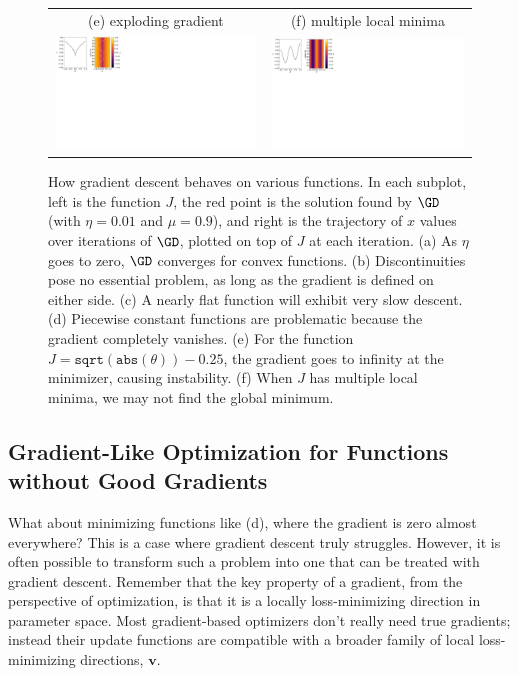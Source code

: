 \begin{figure}[h!]
{\begin{tabular}{cc}
            (e) exploding gradient                                                                 & (f) multiple local minima                                                              \\
            \includegraphics[width=0.5\linewidth]{./figures/gradient_descent/grad_descent_ex5.pdf} & \includegraphics[width=0.5\linewidth]{./figures/gradient_descent/grad_descent_ex6.pdf}
        \end{tabular}
    }
    \caption{How gradient descent behaves on various functions. In each subplot, left is the function $J$, the red point is the solution found by $\GD$ (with $\eta=0.01$ and $\mu=0.9$), and right is the trajectory of $x$ values over iterations of $\GD$, plotted on top of $J$ at each iteration. (a) As $\eta$ goes to zero, $\GD$ converges for convex functions. (b) Discontinuities pose no essential problem, as long as the gradient is defined on either side. (c) A nearly flat function will exhibit very slow descent. (d) Piecewise constant functions are problematic because the gradient completely vanishes. (e) For the function $J=\texttt{sqrt}(\texttt{abs}(\theta))-0.25$, the gradient goes to infinity at the minimizer, causing instability. (f) When $J$ has multiple local minima, we may not find the global minimum.}
    \label{fig:gradient_descent:grad_descent_simple_examples}
\end{figure}


\subsection{Gradient-Like Optimization for Functions without Good Gradients}\label{sec:gradient_descent:zeroth_order}
What about minimizing functions like \fig{\ref{fig:gradient_descent:grad_descent_simple_examples}}(d), where the gradient is zero almost everywhere? This is a case where gradient descent truly struggles. However, it is often possible to transform such a problem into one that can be treated with gradient descent. Remember that the key property of a gradient, from the perspective of optimization, is that it is a locally loss-minimizing direction in parameter space. Most gradient-based optimizers don't really need true gradients; instead their update functions are compatible with a broader family of local loss-minimizing directions, $\mathbf{v}$.

